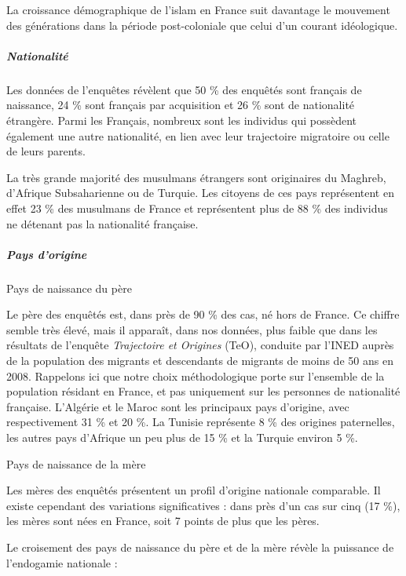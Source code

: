 La croissance démographique de l'islam en France suit davantage le
mouvement des générations dans la période post-coloniale que celui d'un
courant idéologique.


\hypertarget{nationalituxe9}{%
\subparagraph{Nationalité}\label{nationalituxe9}}


Les données de l'enquêtes révèlent que 50 \% des enquêtés sont français
de naissance, 24 \% sont français par acquisition et 26 \% sont de
nationalité étrangère. Parmi les Français, nombreux sont les individus
qui possèdent également une autre nationalité, en lien avec leur
trajectoire migratoire ou celle de leurs parents.

La très grande majorité des musulmans étrangers sont originaires du
Maghreb, d'Afrique Subsaharienne ou de Turquie. Les citoyens de ces pays
représentent en effet 23 \% des musulmans de France et représentent plus
de 88 \% des individus ne détenant pas la nationalité française.




\hypertarget{pays-dorigine}{%
\subparagraph{Pays d'origine}\label{pays-dorigine}}

Pays de naissance du père


Le père des enquêtés est, dans près de 90 \% des cas, né hors de France.
Ce chiffre semble très élevé, mais il apparaît, dans nos données, plus
faible que dans les résultats de l'enquête \emph{Trajectoire et
Origines} (TeO), conduite par l'INED auprès de la population des
migrants et descendants de migrants de moins de 50 ans en 2008.
Rappelons ici que notre choix méthodologique porte sur l'ensemble de la
population résidant en France, et pas uniquement sur les personnes de
nationalité française. L'Algérie et le Maroc sont les principaux pays
d'origine, avec respectivement 31 \% et 20 \%. La Tunisie représente 8
\% des origines paternelles, les autres pays d'Afrique un peu plus de 15
\% et la Turquie environ 5 \%.


Pays de naissance de la mère


Les mères des enquêtés présentent un profil d'origine nationale
comparable. Il existe cependant des variations significatives : dans
près d'un cas sur cinq (17 \%), les mères sont nées en France, soit 7
points de plus que les pères.

Le croisement des pays de naissance du père et de la mère révèle la
puissance de l'endogamie nationale :


